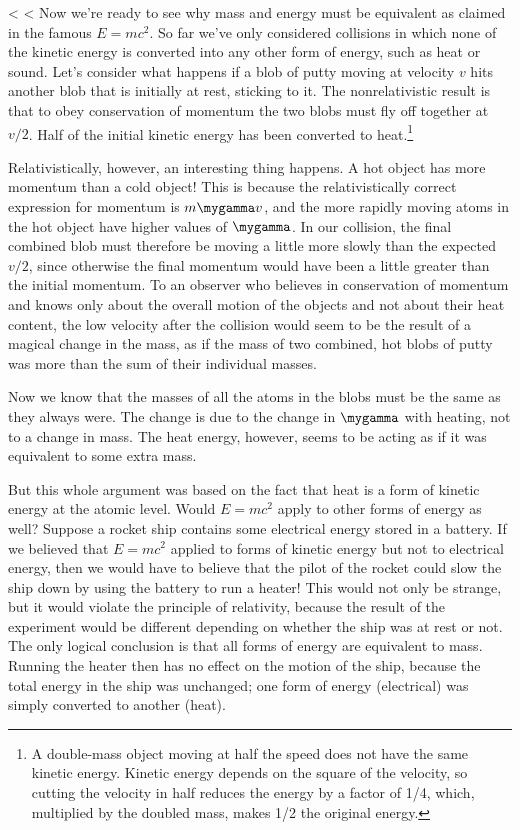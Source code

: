 <%
<%
Now we're ready to see why mass and energy must be equivalent as claimed
in the famous $E=mc^2$. So far we've only considered collisions
in which none of the kinetic energy is converted into any other form
of energy, such as heat or sound.
Let's consider what happens if a blob of putty moving at
velocity $v$ hits another blob that is initially at rest,
sticking to it.  The nonrelativistic result is
that to obey conservation of momentum the two blobs must fly
off together at $v/2$. Half of the initial kinetic energy
has been converted to heat.\footnote{A double-mass object moving
at half the speed does not have the same kinetic energy. Kinetic
energy depends on the square of the velocity, so cutting the velocity
in half reduces the energy by a factor of 1/4, which, multiplied
by the doubled mass, makes 1/2 the original energy.}

Relativistically, however, an interesting thing happens. A
hot object has more momentum than a cold object! This is
because the relativistically correct expression for momentum
is $m\mygamma v$, and the more rapidly moving atoms in the hot
object have higher values of $\mygamma$.
In our collision, the final combined blob must therefore be
moving a little more slowly than the expected $v/2$, since
otherwise the final momentum would have been a little
greater than the initial momentum. To an observer who
believes in conservation of momentum and knows only about
the overall motion of the objects and not about their heat
content, the low velocity after the collision would seem
to be the result of a magical change in the mass, as if the mass
of two combined, hot blobs of putty was more than the sum of
their individual masses.

Now we know that the masses of all the atoms in the blobs
must be the same as they always were. The change is due to
the change in $\mygamma$ with heating, not to a change in mass.
The heat energy, however, seems to be acting as if it was
equivalent to some extra mass.


But this whole argument was based on the fact that heat is a
form of kinetic energy at the atomic level. Would $E=mc^2$
apply to other forms of energy as well? Suppose a rocket
ship contains some electrical energy stored in a
battery. If we believed that $E=mc^2$ applied to forms of
kinetic energy but not to electrical energy, then
we would have to believe that the pilot of the rocket could
slow the ship down by using the battery to run a heater!
This would not only be strange, but it would violate the
principle of relativity, because the result of the
experiment would be different depending on whether the ship
was at rest or not. The only logical conclusion is that all
forms of energy are equivalent to mass. Running the heater
then has no effect on the motion of the ship, because the
total energy in the ship was unchanged; one form of energy (electrical)
was simply converted to another (heat).

